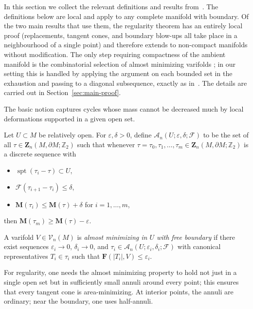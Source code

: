 In this section we collect the relevant definitions and results from~\cite{LZ17}. The definitions below are local and apply to any complete manifold with boundary. Of the two main results that use them, the regularity theorem \cite[Theorem~6.2]{LZ17} has an entirely local proof (replacements, tangent cones, and boundary blow-ups all take place in a neighbourhood of a single point) and therefore extends to non-compact manifolds without modification. The only step requiring compactness of the ambient manifold is the combinatorial selection of almost minimizing varifolds \cite[Theorem~5.3]{LZ17}; in our setting this is handled by applying the argument on each bounded set in the exhaustion and passing to a diagonal subsequence, exactly as in~\cite[\S7]{CL20}. The details are carried out in Section~\ref{sec:main-proof}.

The basic notion captures cycles whose mass cannot be decreased much by local deformations supported in a given open set.

\begin{definition}\label{def:am-free-bdy}
Let $U\subset M$ be relatively open. For $\varepsilon,\delta>0$, define $\mathscr{A}_n(U;\varepsilon,\delta;\mathcal{F})$ to be the set of all $\tau\in\mathbf{Z}_n(M,\partial M;\mathbb{Z}_2)$ such that whenever $\tau=\tau_0,\tau_1,\ldots,\tau_m\in\mathbf{Z}_n(M,\partial M;\mathbb{Z}_2)$ is a discrete sequence with
\begin{itemize}
    \item $\operatorname{spt}(\tau_i-\tau)\subset U$,
    \item $\mathcal{F}(\tau_{i+1}-\tau_i)\le\delta$,
    \item $\mathbf{M}(\tau_i)\le\mathbf{M}(\tau)+\delta$ for $i=1,\ldots,m$,
\end{itemize}
then $\mathbf{M}(\tau_m)\ge\mathbf{M}(\tau)-\varepsilon$.

A varifold $V\in\mathcal{V}_n(M)$ is \emph{almost minimizing in $U$ with free boundary} if there exist sequences $\varepsilon_i\to 0$, $\delta_i\to 0$, and $\tau_i\in\mathscr{A}_n(U;\varepsilon_i,\delta_i;\mathcal{F})$ with canonical representatives $T_i\in\tau_i$ such that $\mathbf{F}(|T_i|,V)\le\varepsilon_i$.
\end{definition}

For regularity, one needs the almost minimizing property to hold not just in a single open set but in sufficiently small annuli around every point; this ensures that every tangent cone is area-minimizing. At interior points, the annuli are ordinary; near the boundary, one uses half-annuli.

